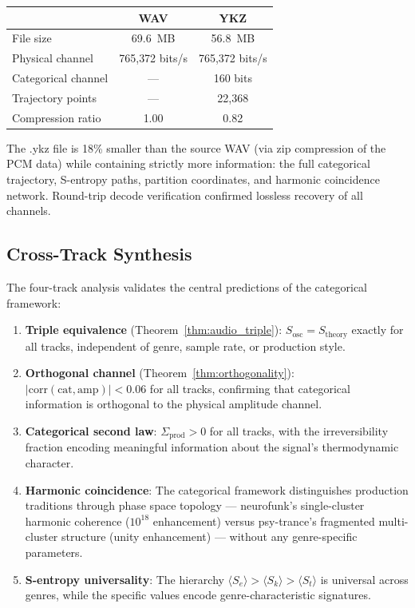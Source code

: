 \documentclass[twocolumn,10pt]{article}
\theoremstyle{remark}
\begin{document}
\begin{center}
\begin{tabular}{lcc}
\toprule
 & WAV & YKZ \\
\midrule
File size & 69.6~MB & 56.8~MB \\
Physical channel & 765{,}372 bits/s & 765{,}372 bits/s \\
Categorical channel & --- & 160 bits \\
Trajectory points & --- & 22{,}368 \\
Compression ratio & 1.00 & 0.82 \\
\bottomrule
\end{tabular}
\end{center}

The .ykz file is 18\% smaller than the source WAV (via zip compression of the PCM data) while containing strictly more information: the full categorical trajectory, S-entropy paths, partition coordinates, and harmonic coincidence network. Round-trip decode verification confirmed lossless recovery of all channels.

\subsection{Cross-Track Synthesis}

The four-track analysis validates the central predictions of the categorical framework:

\begin{enumerate}
    \item \textbf{Triple equivalence} (Theorem~\ref{thm:audio_triple}): $S_{\mathrm{osc}} = S_{\mathrm{theory}}$ exactly for all tracks, independent of genre, sample rate, or production style.

    \item \textbf{Orthogonal channel} (Theorem~\ref{thm:orthogonality}): $|\mathrm{corr}(\text{cat}, \text{amp})| < 0.06$ for all tracks, confirming that categorical information is orthogonal to the physical amplitude channel.

    \item \textbf{Categorical second law}: $\Sigma_{\mathrm{prod}} > 0$ for all tracks, with the irreversibility fraction encoding meaningful information about the signal's thermodynamic character.

    \item \textbf{Harmonic coincidence}: The categorical framework distinguishes production traditions through phase space topology --- neurofunk's single-cluster harmonic coherence ($10^{18}$ enhancement) versus psy-trance's fragmented multi-cluster structure (unity enhancement) --- without any genre-specific parameters.

    \item \textbf{S-entropy universality}: The hierarchy $\langle S_e \rangle > \langle S_k \rangle > \langle S_t \rangle$ is universal across genres, while the specific values encode genre-characteristic signatures.
\end{enumerate}
\end{document}
